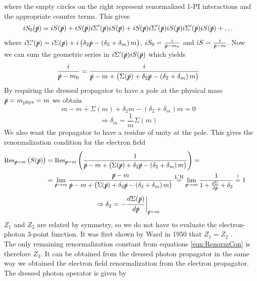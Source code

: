 where the empty circles on the right represent renormalized 1-PI interactions and the appropriate counter terms. This gives
\begin{equation}
iS_0(\slashed{p}) = iS(\slashed{p}) + iS(\slashed{p}) i\Sigma'(\slashed{p}) iS(\slashed{p}) + iS(\slashed{p}) i\Sigma'(\slashed{p}) iS(\slashed{p}) i\Sigma'(\slashed{p}) iS(\slashed{p}) + \dots
\end{equation}
where $i\Sigma'(\slashed{p}) = i\Sigma(\slashed{p}) + i \left( \delta_2 \slashed{p} - \left( \delta_2 + \delta_m \right) m \right)$, $iS_0 = \frac{i}{\slashed{p} - m_0}$ and $iS = \frac{i}{\slashed{p} - m}$. Now we can sum the geometric series in $i\Sigma'(\slashed{p})iS(\slashed{p})$ which yields
\begin{equation}
\frac{i}{\slashed{p}-m_0} = \frac{i}{\slashed{p} - m + \left( \Sigma(\slashed{p}) + \delta_2 \slashed{p} - \left( \delta_2 + \delta_m \right) m \right)}
\end{equation}
By requiring the dressed propagator to have a pole at the physical mass $\slashed{p} = m_{\mathrm{phys}} = m$ we obtain 
\begin{equation}
m - m + \Sigma(m) + \delta_2 m - \left( \delta_2 + \delta_m \right) m = 0
\end{equation}
\begin{equation}
\Rightarrow \delta_m = \frac{1}{m} \Sigma(m)
\end{equation}
We also want the propagator to have a residue of unity at the pole. This gives the renormalization condition for the electron field
\begin{align*}
\mathrm{Res}_{\slashed{p} = m} \left( S(\slashed{p}) \right) & = \mathrm{Res}_{\slashed{p} = m} \left( \frac{1}{\slashed{p} - m + \left( \Sigma(\slashed{p}) + \delta_2 \slashed{p} - \left( \delta_2 + \delta_m \right) m \right)} \right) = & \\
& = \lim_{\slashed{p} \rightarrow m} \frac{\slashed{p} - m}{\slashed{p} - m + \left( \Sigma(\slashed{p}) + \delta_2 \slashed{p} - \left( \delta_2 + \delta_m \right) m \right)} \overset{\mathrm{L'H}}{=} \lim_{\slashed{p} \rightarrow m} \frac{1}{1 + \frac{d\Sigma}{d\slashed{p}} + \delta_2} \overset{\mathrm{!}}{=} 1 &
\end{align*}
\begin{equation}
\Rightarrow \delta_2 = - \frac{d\Sigma(\slashed{p})}{d\slashed{p}} \biggr\rvert_{\slashed{p} = m}
\end{equation}
$Z_1$ and $Z_2$ are related by symmetry, so we do not have to evaluate the electron-photon 3-point function. It was first shown by Ward in 1950 that $Z_1 = Z_2$ \cite{WardId}. \\
The only remaining renormalization constant from equations \ref{eqn:RenormCon} is therefore $Z_3$. It can be obtained from the dressed photon propagator in the same way we obtained the electron field renormalization from the electron propagator. The dressed photon operator is given by
